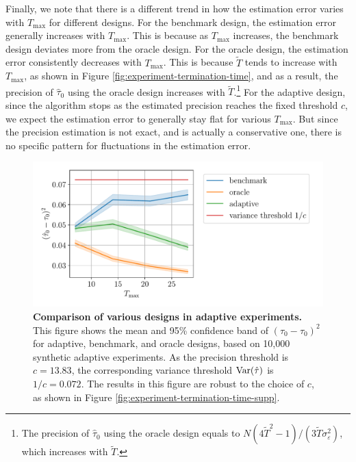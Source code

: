{Finally, we note that there is a different trend in how the estimation error varies with $T_{\max}$ for different designs. For the benchmark design, the estimation error generally increases with $T_{\max}$. This is because as $T_{\max}$ increases, the benchmark design deviates more from the oracle design. For the oracle design, the estimation error consistently decreases with $T_{\max}$. This is because $\tilde{T}$ tends to increase with $T_{\max}$, as shown in Figure \ref{fig:experiment-termination-time}, and as a result, the precision of $\hat{\tau}_0$ using the oracle design increases with $\tilde{T}$.\footnote{The precision of $\hat{\tau}_0$ using the oracle design equals to $N (4\tilde{T}^2 - 1)/(3  \tilde T \sigma^2_\varepsilon) $, which increases with $\tilde{T}$.} For the adaptive design, since the algorithm stops as the estimated precision reaches the fixed threshold $c$, we expect the estimation error to generally stay flat for various $T_{\max}$. But since the precision estimation is not exact, and is actually a conservative one, there is no specific pattern for fluctuations in the estimation error.
    \begin{figure}[t!]
    \centering
    \includegraphics[width=0.6\linewidth]{plots/empirical/flu/adaptive/flu_adaptive_comparison.pdf}
	\caption{\textbf{Comparison of various designs in adaptive experiments.} This figure shows the mean and 95\% confidence band of $(\hat{\tau}_0 - \tau_0)^2$ for adaptive, benchmark, and oracle designs, based on 10,000 synthetic adaptive experiments. As the precision threshold is $c = 13.83$, the corresponding variance threshold $\mathrm{Var}(\hat{\tau})$ is $1/c=0.072$. 
	The results in this figure are robust to the choice of $c$, as shown in Figure \ref{fig:experiment-termination-time-supp}.
	}
	\label{fig:various-opt-design}
\end{figure}


}